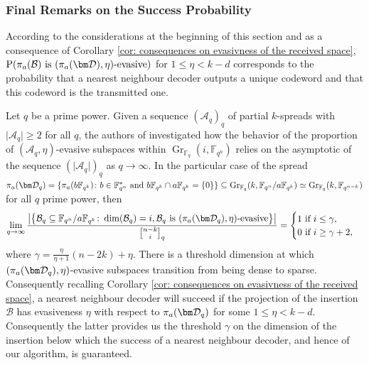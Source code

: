 \documentclass{article}
\newcommand{\F}{\mathbb{F}}
\newcommand{\Fq}{\mathbb{F}_{q}}
\newcommand{\Fqn}{\mathbb{F}_{q^n}}
\newcommand{\Fqk}{\mathbb{F}_{q^k}}
\newcommand{\calA}{\mathcal{A}}
\newcommand{\calB}{\mathcal{B}}
\newcommand{\calD}{\mathcal{D}}
\newcommand{\gbinom}[2]{\genfrac{[}{]}{0pt}{}{#1}{#2}}
\DeclareMathOperator{\Gr}{Gr}
\begin{document}
\subsubsection{Final Remarks on the Success Probability}
According to the considerations at the beginning of this section and as a consequence of Corollary \ref{cor: consequences on evasivness of the received space}, $\mathrm{P}(\pi_a(\calB) \text{ is } (\pi_a(\bm \calD),\eta)\text{-evasive})$ for $1 \leq \eta < k-d$ corresponds to the probability that a nearest neighbour decoder outputs a unique codeword and that this codeword is the transmitted one.

\medskip
Let $q$ be a prime power. Given a sequence $(\calA_q)_{q}$ of partial $k$-spreads with $\lvert\calA_q\rvert\geq 2$ for all $q$, the authors of \cite{gruica2024generalised} investigated how the behavior of the proportion of $(\calA_q,\eta)$-evasive subspaces within $\Gr_{\Fq}(i,\Fqn)$ relies on the asymptotic of the sequence $\left(\lvert\calA_q\rvert\right)_q$ as $q\rightarrow\infty$. 
In the particular case of the spread $\pi_a(\bm \calD_q)= \{\pi_a(b\Fqk)\colon  b\in\Fqn^*\text{ and }b\Fqk\cap a\Fqk=\{0\}\}\subseteq\Gr_{\Fq}(k,\Fqn/a\Fqk)\simeq\Gr_{\Fq}(k,\F_{q^{n-k}})$ for all $q$ prime power, then
\begin{equation}
    \label{eq: threshold dimension}
\lim_{q\rightarrow\infty}\frac{\left\lvert\left\{\calB_q\subseteq\Fqn/a\Fqk\colon\dim(\calB_q)=i, \calB_q\text{ is }(\pi_a(\bm \calD_q),\eta)\text{-evasive}\right\}\right\rvert}{\gbinom{n-k}{i}_q}=\begin{cases}
    1\text{ if }i\leq \gamma,\\
    0\text{ if }i\geq \gamma+2,
\end{cases}
\end{equation}
where $\gamma=\frac{\eta}{\eta+1}(n-2k)+\eta$. There is a threshold dimension at which $(\pi_a(\bm \calD_q),\eta)$-evasive subspaces transition from being dense to sparse. Consequently recalling Corollary \ref{cor: consequences on evasivness of the received space}, a nearest neighbour decoder will succeed if the projection of the insertion $\calB$ has evasiveness $\eta$ with respect to $\pi_a(\bm \calD_q)$ for some $1\leq\eta < k-d$. Consequently the latter provides us the threshold $\gamma$ on the dimension of the insertion below which the success of a nearest neighbour decoder, and hence of our algorithm, is guaranteed. 
\end{document}
